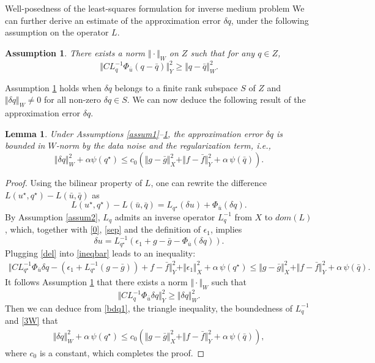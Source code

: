 \documentclass[11pt]{article}%
\renewcommand{\_}{{\fontfamily{ptm}\selectfont\textunderscore}}
\theoremstyle{plain}
\numberwithin{equation}{section}
\newtheorem{lemma}{Lemma}
\newtheorem{assumption}{Assumption}
\begin{document}
\begin{section}{Well-posedness of the least-squares formulation for inverse medium problem}
We can further derive an estimate of the approximation error $\delta q$, under the following assumption on the operator $L$.
\begin{assumption}\label{assum3}
There exists a norm $\Vert\cdot\Vert_W$ on $Z$ such that for any $q\in Z$,
$$
\Vert CL_q^{-1}\Phi_{\bar{u}}(q-\bar{q})\Vert^2_Y \ge \Vert q-\bar{q}\Vert_W^2.
$$
\end{assumption}
Assumption \ref{assum3} holds when $\delta q$ belongs to a finite rank subspace $S$ of $Z$
and $\Vert\delta q\Vert_W\neq 0$ for all non-zero $\delta q\in S$. We can now deduce the following result of the approximation error $\delta q$.
\begin{lemma}\label{lemmaW}
Under Assumptions \ref{assum1}--\ref{assum3}, the approximation error 
 $\delta q$ is bounded in $W$-norm by the data noise and the regularization term, i.e., 
 \begin{equation}
\Vert \delta q\Vert_W^2+\alpha\psi(q^\star)\le c_0\left(\Vert g-\bar{g}\Vert_X^2+\Vert f-\bar{f}\Vert_Y^2+\alpha\,\psi(\bar{q})\right).\label{111}
\end{equation}
\end{lemma}
\begin{proof}
Using the bilinear property of $L$, one can rewrite the difference $L(u^\star, q^\star)-L(\bar{u},\bar{q})$ as
\begin{equation}
L(u^\star, q^\star)-L(\bar{u},\bar{q})=L_{q^\star}(\delta u)+\Phi_{\bar u}(\delta q).\label{sep}
\end{equation}
By Assumption \ref{assum2}, $L_q$ admits an inverse operator $L_q^{-1}$ from $X$ to $dom(L)$, which, together with \eqref{0}, \eqref{sep} and the definition of $\epsilon_1$, implies
\begin{equation}
 \delta u=L_{q^\star}^{-1}(\epsilon_1+g-\bar{g}-\Phi_{\bar{u}}( \delta q)).\label{del}
\end{equation}
Plugging \eqref{del} into \eqref{ineqbar} leads to an inequality:
\begin{eqnarray}
\Vert CL_{q^\star}^{-1}\Phi_{\bar{u}}\delta q-(\epsilon_1+L_{q^\star}^{-1}(g-\bar{g}))+f-\bar{f}\Vert_Y^2
+\Vert \epsilon_1\Vert_X^2+\alpha\,\psi(q^\star)
\le \Vert g-\bar{g}\Vert_X^2+\Vert f-\bar{f}\Vert_Y^2+\alpha\,\psi(\bar{q}).\label{bdq1}
\end{eqnarray}
It follows Assumption \ref{assum3} that there exists a norm $\Vert\cdot\Vert_W$ such that
\begin{equation}\label{3W}
\Vert CL_q^{-1}\Phi_{\bar{u}}\delta q\Vert_Y^2 \ge \Vert \delta q\Vert^2_W.
\end{equation}
Then we can deduce from \eqref{bdq1}, the triangle inequality, the boundedness of $L_q^{-1}$ and \eqref{3W} that 
\begin{eqnarray*}
\Vert \delta q\Vert_W^2+\alpha\,\psi(q^\star)\le c_0 (\Vert g-\bar{g}\Vert_X^2+\Vert f-\bar{f}\Vert_Y^2+\alpha\,\psi(\bar{q})),
\end{eqnarray*}
where $c_0$ is a constant, which completes the proof.
\end{proof}



\end{section}
\end{document}
